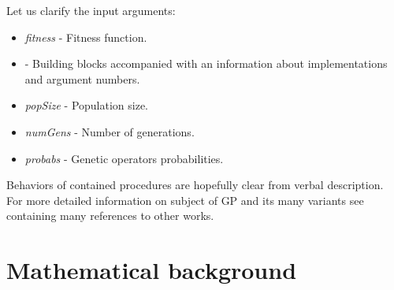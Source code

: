 \documentclass[12pt,a4paper]{report}
\newcommand{\Lets}{Let us\xspace}
\begin{document}
\begin{samepage}
\Lets clarify the input arguments:
\begin{itemize}
	\item \textit{fitness} - Fitness function.
	\item \textit{\TuF} - Building blocks accompanied with an  	
	      information about implementations and argument numbers.
	\item \textit{popSize} - Population size.
	\item \textit{numGens} - Number of generations.
	\item \textit{probabs} - Genetic operators probabilities.
\end{itemize} 
\end{samepage}


Behaviors of contained procedures are hopefully clear from verbal description.
\\[2em]

For more detailed information on subject of GP and its many variants
see \cite{fg} containing many references to other works. 
  




\chapter{Mathematical background}

\newcommand{\then}{\Rightarrow\xspace}

\newcommand{\lamb}[2]{( \lambda \, #1 \, . \, #2 )}
\newcommand{\lam}[2]{\lambda \, #1 \, . \, #2}

\newcommand{\ST}{\mathop{\mathrm{ST}}}
\newcommand{\FV}{\mathop{\mathrm{FV}}}

\newcommand{\Scomb }{\mathbf{S}}
\newcommand{\Kcomb }{\mathbf{K}}
\newcommand{\Icomb }{\mathbf{I}}


\newcommand{\bbarr}{\twoheadrightarrow_\beta}
\newcommand{\barr}{\rightarrow_\beta}
\newcommand{\beq}{=_\beta}

\newcommand{\eearr}{\twoheadrightarrow_\eta}
\newcommand{\earr}{\rightarrow_\eta}
\newcommand{\eeq}{=_\eta}

\newcommand{\bearr}{\rightarrow_{\beta\eta}}
\newcommand{\bbeearr}{\twoheadrightarrow_{\beta\eta}}
\newcommand{\beeq}{=_{\beta\eta}}


\newcommand{\etar}{\twoheadrightarrow_\eta}
\newcommand{\ered}{$\eta$-reduction\xspace}
\newcommand{\bnf}{$\beta$-\textit{nf}\xspace}
\newcommand{\enf}{$\eta$-\textit{nf}\xspace}
\newcommand{\eenf}{$\eta^{-1}$-\textit{nf}\xspace}
\newcommand{\beenf}{$\beta\eta^{-1}$-\textit{nf}\xspace}
\newcommand{\benf}{$\beta\eta$-\textit{nf}\xspace}
\newcommand{\bredex}{$\beta$-redex\xspace} 
\end{document}
